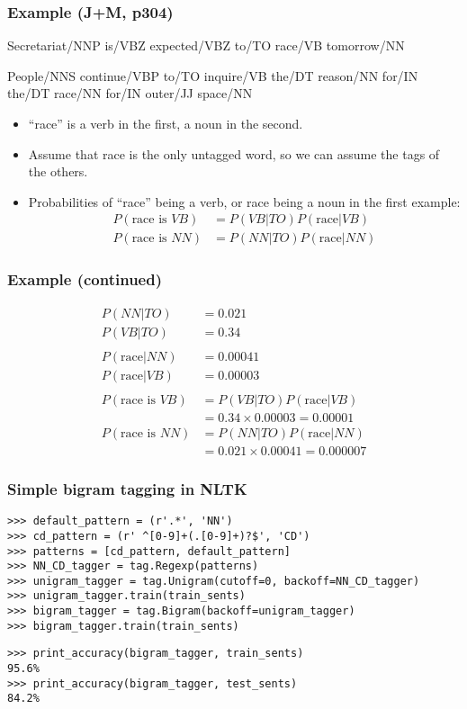 \documentclass{beamer}             %
\begin{document}
\begin{frame}
  \frametitle{Example (J+M, p304)}
  {\small
  Secretariat/NNP is/VBZ expected/VBZ to/TO \alert{race/VB} tomorrow/NN

  \medskip
  People/NNS continue/VBP to/TO inquire/VB the/DT reason/NN for/IN the/DT
  \alert{race/NN} for/IN outer/JJ space/NN
  }

  \begin{itemize}
  \item<2-> ``race'' is a verb in the first, a noun in the second.
  \item<3-> Assume that race is the only untagged word, so we can assume
    the tags of the others.
  \item<4-> Probabilities of ``race'' being a verb, or race being a noun
    in the first example:
    \begin{align*}
      P(\mbox{race is }VB) &= P(VB|TO) P(\mbox{race}|VB) \\
      P(\mbox{race is }NN) &= P(NN|TO) P(\mbox{race}|NN) 
    \end{align*}
  \end{itemize}
\end{frame}

\begin{frame}
  \frametitle{Example (continued)}
  \begin{align*}
    P(NN|TO) &= 0.021 \\
    P(VB|TO) &= 0.34 \\
    \\
    P(\mbox{race}|NN) &= 0.00041\\
    P(\mbox{race}|VB) &= 0.00003\\
    \\
    P(\mbox{race is }VB) &= P(VB|TO) P(\mbox{race}|VB) \\
    &= 0.34 \times 0.00003 = 0.00001 \\
    P(\mbox{race is }NN) &= P(NN|TO) P(\mbox{race}|NN) \\
    &= 0.021 \times 0.00041 = 0.000007
   \end{align*}
\end{frame}

\begin{frame}[fragile]
  \frametitle{Simple bigram tagging in NLTK}
{\small
\begin{verbatim}
>>> default_pattern = (r'.*', 'NN')
>>> cd_pattern = (r' ^[0-9]+(.[0-9]+)?$', 'CD')
>>> patterns = [cd_pattern, default_pattern]
>>> NN_CD_tagger = tag.Regexp(patterns)
>>> unigram_tagger = tag.Unigram(cutoff=0, backoff=NN_CD_tagger)
>>> unigram_tagger.train(train_sents)
>>> bigram_tagger = tag.Bigram(backoff=unigram_tagger)
>>> bigram_tagger.train(train_sents)
\end{verbatim}%

\begin{verbatim}
>>> print_accuracy(bigram_tagger, train_sents)
95.6%
>>> print_accuracy(bigram_tagger, test_sents)
84.2%
\end{verbatim}
}
\end{frame}
\end{document}
